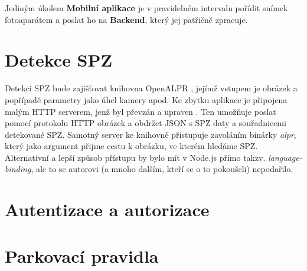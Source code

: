 Jediným úkolem \textbf{Mobilní aplikace} je v pravidelném intervalu pořídit snímek fotoaparátem a poslat ho na
\textbf{Backend}, který jej patřičně zpracuje.





\section{Detekce SPZ}

Detekci SPZ bude zajišťovat knihovna OpenALPR \citep[viz][]{OpenALPR}, jejímž vstupem je obrázek a popřípadě
parametry jako úhel kamery apod. Ke zbytku aplikace je připojena malým HTTP serverem, jenž byl převzán a upraven
\citep[viz][]{OpenALPR_Server}.
Ten umožňuje poslat pomocí protokolu HTTP obrázek a obdržet JSON s SPZ daty a souřadnicemi detekované SPZ.
Samotný server ke knihovně přistupuje zavoláním binárky \textit{alpr}, který jako argument přijme cestu k
obrázku, ve kterém hledáme SPZ. Alternativní a lepší způsob přístupu by bylo mít v Node.js přímo takzv.
\textit{language-binding}, ale to se autorovi (a mnoho dalším, kteří se o to pokoušeli) nepodařilo.


\section{Autentizace a autorizace} \label{db_schema}


\section{Parkovací pravidla} \label{analysis_parking_schema}

